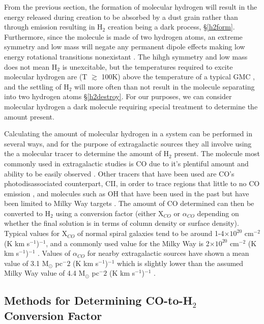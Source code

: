 From the previous section, the formation of molecular hydrogen will result in the energy released during creation to be absorbed by a dust grain rather than through emission resulting in H$_2$ creation being a dark process, \S\ref{h2form}.  Furthermore, since the molecule is made of two hydrogen atoms, an extreme symmetry and low mass will negate any permanent dipole effects making low energy rotational transitions nonexistant \citep{bolatto2013,kennicutt2012}.  The hihgh symmetry and low mass does not mean H$_2$ is unexcitable, but the temperatures required to excite molecular hydrogen are (T $\gtrsim$ 100K) above the temperature of a typical GMC \citep{bolatto2013}, and the settling of H$_2$ will more often than not result in the molecule separating into two hydrogen atoms \S\ref{h2destroy}.  For our purposes, we can consider molecular hydrogen a dark molecule requiring special treatment to determine the amount present.

Calculating the amount of molecular hydrogen in a system can be performed in several ways, and for the purpose of extragalactic sources they all involve using the  a molecular tracer to determine the amount of H$_2$ present.  The molecule most commonly used in extragalactic studies is CO due to it's plentiful amount and ability to be easily observed \citep{bolatto2013}.  Other tracers that have been used are CO's photodisassociated counterpart, CII, in order to trace regions that little to no CO emission \citep{madden1997}, and molecules such as OH that have been used in the past but have been limited to Milky Way targets \citep{barrett1964}.  The amount of CO determined can then be converted to H$_2$ using a conversion factor (either X$_{CO}$ or $\alpha_{CO}$ depending on whether the final solution is in terms of column density or surface density).  Typical values for X$_{CO}$ of normal spiral galaxies tend to be around 1-4$\times 10^{20}$ cm$^{-2}$ (K km s$^{-1}$)$^{-1}$, and a commonly used value for the Milky Way is 2$\times 10^{20}$ cm$^{-2}$ (K km s$^{-1}$)$^{-1}$ \citep{bolatto2013}. Values of $\alpha_{CO}$ for nearby extragalactic sources have shown a mean value of 3.1 M$_\odot$ pc$^-2$ (K km s$^{-1}$)$^{-1}$ which is slightly lower than the assumed Milky Way value of 4.4 M$_\odot$ pc$^-2$ (K km s$^{-1}$)$^{-1}$ \citep{sandstrom2013}.

\subsection{Methods for Determining CO-to-H$_2$ Conversion Factor}

